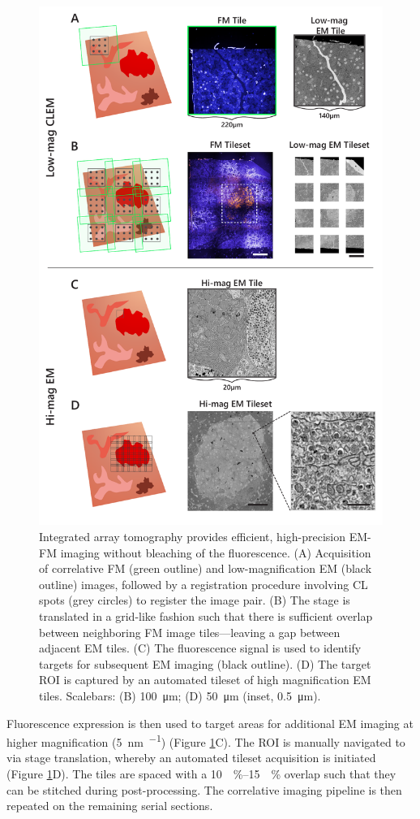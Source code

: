 \begin{figure}[!tb]
    \centering
    \includegraphics[width=0.78\linewidth]{chapter-3/figures_PDF/fig3-2_acq-strat.pdf}
    \caption{Integrated array tomography provides efficient, high-precision EM-FM imaging without bleaching of the fluorescence.
    (A) Acquisition of correlative FM (green outline) and low-magnification EM (black outline) images, followed by a registration procedure involving CL spots (grey circles) to register the image pair.
    (B) The stage is translated in a grid-like fashion such that there is sufficient overlap between neighboring FM image tiles—leaving a gap between adjacent EM tiles.
    (C) The fluorescence signal is used to identify targets for subsequent EM imaging (black outline).
    (D) The target ROI is captured by an automated tileset of high magnification EM tiles.
    Scalebars: (B) \SI{100}{\micro\meter}; (D) \SI{50}{\micro\meter} (inset, \SI{0.5}{\micro\meter}).}
    \label{fig:3.2_acqstrat}
\end{figure}

Fluorescence expression is then used to target areas for additional EM imaging at higher magnification (\SI{5}{\nano\meter\per\pixel}) (Figure \ref{fig:3.2_acqstrat}C). The ROI is manually navigated to via stage translation, whereby an automated tileset acquisition is initiated (Figure \ref{fig:3.2_acqstrat}D). The tiles are spaced with a \SIrange{10}{15}{\!\%} overlap such that they can be stitched during post-processing. The correlative imaging pipeline is then repeated on the remaining serial sections.


